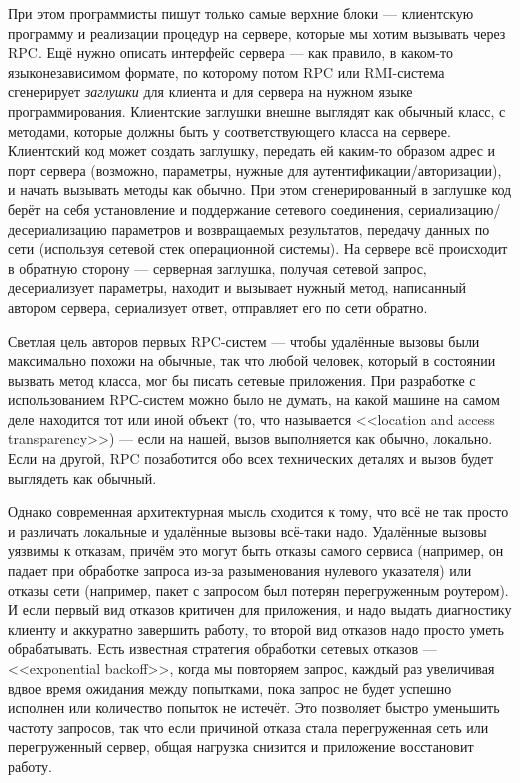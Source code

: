 \documentclass[a5paper]{article}
\begin{document}
При этом программисты пишут только самые верхние блоки --- клиентскую программу и реализации процедур на сервере, которые мы хотим вызывать через RPC. Ещё нужно описать интерфейс сервера --- как правило, в каком-то языконезависимом формате, по которому потом RPC или RMI-система сгенерирует \emph{заглушки} для клиента и для сервера на нужном языке программирования. Клиентские заглушки внешне выглядят как обычный класс, с методами, которые должны быть у соответствующего класса на сервере. Клиентский код может создать заглушку, передать ей каким-то образом адрес и порт сервера (возможно, параметры, нужные для аутентификации/авторизации), и начать вызывать методы как обычно. При этом сгенерированный в заглушке код берёт на себя установление и поддержание сетевого соединения, сериализацию/десериализацию параметров и возвращаемых результатов, передачу данных по сети (используя сетевой стек операционной системы). На сервере всё происходит в обратную сторону --- серверная заглушка, получая сетевой запрос, десериализует параметры, находит и вызывает нужный метод, написанный автором сервера, сериализует ответ, отправляет его по сети обратно.

Светлая цель авторов первых RPC-систем --- чтобы удалённые вызовы были максимально похожи на обычные, так что любой человек, который в состоянии вызвать метод класса, мог бы писать сетевые приложения. При разработке с использованием RPС-систем можно было не думать, на какой машине на самом деле находится тот или иной объект (то, что называется <<location and access transparency>>) --- если на нашей, вызов выполняется как обычно, локально. Если на другой, RPC позаботится обо всех технических деталях и вызов будет выглядеть как обычный.

Однако современная архитектурная мысль сходится к тому, что всё не так просто и различать локальные и удалённые вызовы всё-таки надо. Удалённые вызовы уязвимы к отказам, причём это могут быть отказы самого сервиса (например, он падает при обработке запроса из-за разыменования нулевого указателя) или отказы сети (например, пакет с запросом был потерян перегруженным роутером). И если первый вид отказов критичен для приложения, и надо выдать диагностику клиенту и аккуратно завершить работу, то второй вид отказов надо просто уметь обрабатывать. Есть известная стратегия обработки сетевых отказов --- <<exponential backoff>>, когда мы повторяем запрос, каждый раз увеличивая вдвое время ожидания между попытками, пока запрос не будет успешно исполнен или количество попыток не истечёт. Это позволяет быстро уменьшить частоту запросов, так что если причиной отказа стала перегруженная сеть или перегруженный сервер, общая нагрузка снизится и приложение восстановит работу.
\end{document}
